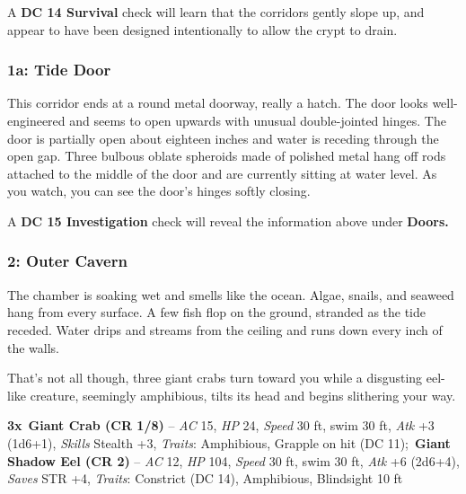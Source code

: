 \documentclass[10pt,twocolumn]{article}
\let\oldtextbf\textbf
\renewcommand{\textbf}[1]{\oldtextbf{{#1}}}
\renewenvironment{quote}
  {%
    \begingroup
      \setlength{\parindent}{1em}%
      \setlength{\parskip}{0pt}%
      \begin{tcolorbox}[myquote,
        before upper={%
          \let\textbf\oldtextbf
          \setlength{\parindent}{1.5em}%
          \setlength{\parskip}{0pt}%
          \noindent              %
        }%
      ]%
  }
  {%
      \end{tcolorbox}%
    \endgroup
  }
\begin{document}
A \textbf{DC 14 Survival} check will learn that the corridors gently
slope up, and appear to have been designed intentionally to allow the
crypt to drain.

\subsubsection{1a: Tide Door}\label{a-tide-door}

\begin{quote}
This corridor ends at a round metal doorway, really a hatch. The door
looks well-engineered and seems to open upwards with unusual
double-jointed hinges. The door is partially open about eighteen inches
and water is receding through the open gap. Three bulbous oblate
spheroids made of polished metal hang off rods attached to the middle of
the door and are currently sitting at water level. As you watch, you can
see the door's hinges softly closing.
\end{quote}

A \textbf{DC 15 Investigation} check will reveal the information above
under \textbf{Doors.}

\subsubsection{2: Outer Cavern}\label{outer-cavern}

\begin{quote}
The chamber is soaking wet and smells like the ocean. Algae, snails, and
seaweed hang from every surface. A few fish flop on the ground, stranded
as the tide receded. Water drips and streams from the ceiling and runs
down every inch of the walls.~

That's not all though, three giant crabs turn toward you while a
disgusting eel-like creature, seemingly amphibious, tilts its head and
begins slithering your way.
\end{quote}

\begin{tcolorbox}[
  enhanced,
  breakable,
  colback={encountercolor},
  colframe=black,
  boxrule=1pt,
  coltext=black,
  arc=6pt,
  left=4pt,
  right=4pt,
  top=2pt,
  bottom=2pt,
  boxsep=4pt,
  before skip=10pt,
  after skip=10pt,
  fontupper={\blockquoteFont\small\linespread{0.9}\selectfont\color{black}}
]

\faSkull\hspace{0.8em}\begin{minipage}[t]{\dimexpr\linewidth-1.8em\hangindent=1.8em\hangafter=0}\textbf{3x}~\textbf{Giant
Crab (CR 1/8)} -- \emph{AC} 15, \emph{HP} 24, \emph{Speed} 30 ft, swim
30 ft, \emph{Atk} +3 (1d6+1), \emph{Skills} Stealth +3, \emph{Traits}:
Amphibious, Grapple on hit (DC 11);~\textbf{Giant Shadow Eel (CR 2)} --
\emph{AC} 12, \emph{HP} 104, \emph{Speed} 30 ft, swim 30 ft, \emph{Atk}
+6 (2d6+4), \emph{Saves} STR +4, \emph{Traits}: Constrict (DC 14),
Amphibious, Blindsight 10 ft

\end{minipage}\end{tcolorbox}
\end{document}
